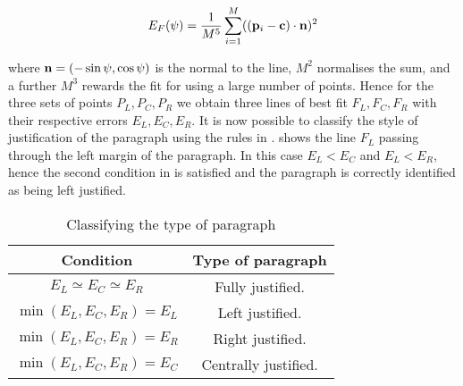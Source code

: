 \begin{equation}
E_F(\psi) = \frac{1}{M^5} \sum_{i=1}^{M} ( ({ \bf p }_i-{ \bf c }) \cdot { \bf n })^2
\label{ransacerroreqn}
\end{equation}

{\parindent 0mm
where
${ \bf n }=(-\sin \psi,\cos \psi)$ is the normal to the line,
$M^{2}$ normalises the sum, and a further $M^{3}$ rewards the fit for using a large
number of points. }
Hence for the three sets of points $P_L,P_C,P_R$ we obtain three lines of best
fit $F_L,F_C,F_R$ with their respective errors $E_L,E_C,E_R$.  It is now
possible to classify the style of justification of the paragraph using the
rules in .   shows the line $F_L$
passing through the left margin of the paragraph.  In this case $E_L<E_C$ and
$E_L<E_R$, hence the second condition in  is satisfied
and the paragraph is correctly identified as being left justified.

\begin{table}[t]
  \begin{center}
    \begin{tabular}{|c|c|}
      \hline
      {\bf Condition} & {\bf Type of paragraph} \\
      \hline \hline
      $E_L \simeq E_C \simeq E_R$ & Fully justified. \\
      \hline
      $\min(E_L,E_C,E_R)=E_L$ & Left justified. \\
      \hline
      $\min(E_L,E_C,E_R)=E_R$ & Right justified. \\
      \hline
      $\min(E_L,E_C,E_R)=E_C$ & Centrally justified. \\
      \hline
    \end{tabular}
  \end{center}
  \caption{Classifying the type of paragraph}
  \label{typeofparatable}
\end{table}



